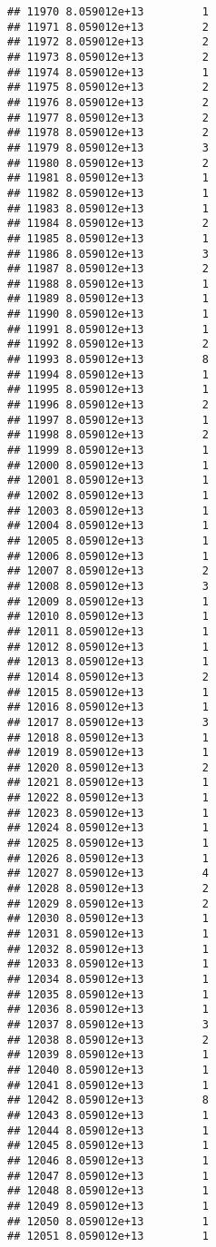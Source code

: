 \documentclass[
]{article}
\begin{document}
\begin{verbatim}
## 11970 8.059012e+13         1
## 11971 8.059012e+13         2
## 11972 8.059012e+13         2
## 11973 8.059012e+13         2
## 11974 8.059012e+13         1
## 11975 8.059012e+13         2
## 11976 8.059012e+13         2
## 11977 8.059012e+13         2
## 11978 8.059012e+13         2
## 11979 8.059012e+13         3
## 11980 8.059012e+13         2
## 11981 8.059012e+13         1
## 11982 8.059012e+13         1
## 11983 8.059012e+13         1
## 11984 8.059012e+13         2
## 11985 8.059012e+13         1
## 11986 8.059012e+13         3
## 11987 8.059012e+13         2
## 11988 8.059012e+13         1
## 11989 8.059012e+13         1
## 11990 8.059012e+13         1
## 11991 8.059012e+13         1
## 11992 8.059012e+13         2
## 11993 8.059012e+13         8
## 11994 8.059012e+13         1
## 11995 8.059012e+13         1
## 11996 8.059012e+13         2
## 11997 8.059012e+13         1
## 11998 8.059012e+13         2
## 11999 8.059012e+13         1
## 12000 8.059012e+13         1
## 12001 8.059012e+13         1
## 12002 8.059012e+13         1
## 12003 8.059012e+13         1
## 12004 8.059012e+13         1
## 12005 8.059012e+13         1
## 12006 8.059012e+13         1
## 12007 8.059012e+13         2
## 12008 8.059012e+13         3
## 12009 8.059012e+13         1
## 12010 8.059012e+13         1
## 12011 8.059012e+13         1
## 12012 8.059012e+13         1
## 12013 8.059012e+13         1
## 12014 8.059012e+13         2
## 12015 8.059012e+13         1
## 12016 8.059012e+13         1
## 12017 8.059012e+13         3
## 12018 8.059012e+13         1
## 12019 8.059012e+13         1
## 12020 8.059012e+13         2
## 12021 8.059012e+13         1
## 12022 8.059012e+13         1
## 12023 8.059012e+13         1
## 12024 8.059012e+13         1
## 12025 8.059012e+13         1
## 12026 8.059012e+13         1
## 12027 8.059012e+13         4
## 12028 8.059012e+13         2
## 12029 8.059012e+13         2
## 12030 8.059012e+13         1
## 12031 8.059012e+13         1
## 12032 8.059012e+13         1
## 12033 8.059012e+13         1
## 12034 8.059012e+13         1
## 12035 8.059012e+13         1
## 12036 8.059012e+13         1
## 12037 8.059012e+13         3
## 12038 8.059012e+13         2
## 12039 8.059012e+13         1
## 12040 8.059012e+13         1
## 12041 8.059012e+13         1
## 12042 8.059012e+13         8
## 12043 8.059012e+13         1
## 12044 8.059012e+13         1
## 12045 8.059012e+13         1
## 12046 8.059012e+13         1
## 12047 8.059012e+13         1
## 12048 8.059012e+13         1
## 12049 8.059012e+13         1
## 12050 8.059012e+13         1
## 12051 8.059012e+13         1

\end{verbatim}
\end{document}
